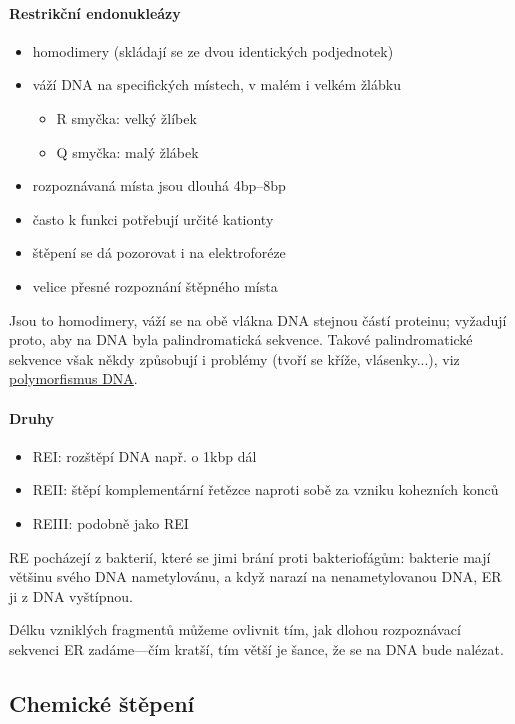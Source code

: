 \documentclass[DIV=8]{scrreprt}
\newcommand{\mybox}[2]{
    \paragraph{#1} #2
}
\begin{document}
\mybox{Restrikční endonukleázy}{\begin{itemize}[nosep]
    \item homodimery (skládají se ze dvou identických podjednotek)
    \item váží DNA na specifických místech, v malém i velkém žlábku
\begin{itemize}[nosep]
    \item R smyčka: velký žlíbek
    \item Q smyčka: malý žlábek
\end{itemize}

    \item rozpoznávaná místa jsou dlouhá 4bp--8bp
    \item často k funkci potřebují určité kationty
    \item štěpení se dá pozorovat i na elektroforéze
    \item velice přesné rozpoznání štěpného místa
\end{itemize}



Jsou to homodimery, váží se na obě vlákna DNA stejnou částí proteinu; vyžadují proto, aby na DNA byla palindromatická sekvence. Takové palindromatické sekvence však někdy způsobují i problémy (tvoří se kříže, vlásenky...), viz \hyperref[Další konformační anomálie]{polymorfismus DNA}.

\paragraph{Druhy}
\begin{itemize}[nosep]
    \item REI: rozštěpí DNA např. o 1kbp dál
    \item REII: štěpí komplementární řetězce naproti sobě za vzniku kohezních konců
    \item REIII: podobně jako REI
\end{itemize}



RE pocházejí z bakterií, které se jimi brání proti bakteriofágům: bakterie mají většinu svého DNA nametylovánu, a když narazí na nenametylovanou DNA, ER ji z DNA vyštípnou.

Délku vzniklých fragmentů můžeme ovlivnit tím, jak dlohou rozpoznávací sekvenci ER zadáme---čím kratší, tím větší je šance, že se na DNA bude nalézat.}


\subsection{Chemické štěpení} \label{Chemické štěpení}
\end{document}
